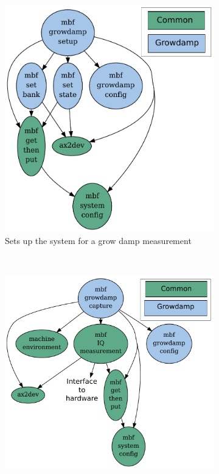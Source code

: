 \documentclass{report}
\begin{document}
\begin{figure}[hbt]
   \centering
    \begin{subfigure}[b]{0.45\textwidth}
        \includegraphics[width=\textwidth]{mbf_growdamp_setup.pdf}
        \caption{Sets up the system for a grow damp measurement}
        \label{fig:growdamp_setup}
    \end{subfigure}
    ~ %
    \begin{subfigure}[b]{0.45\textwidth}
        \includegraphics[width=\textwidth]{mbf_growdamp_capture.pdf}

\end{subfigure}
\end{figure}
\end{document}
